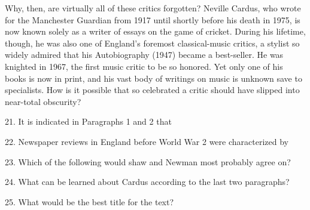 \qquad Why, then, are virtually all of these critics forgotten? Neville Cardus, who wrote for the Manchester Guardian from 1917 until shortly before his death in 1975, is now known solely as a writer of essays on the game of cricket. During his lifetime, though, he was also one of England’s foremost classical-music critics, a stylist so widely admired that his Autobiography (1947) became a best-seller. He was knighted in 1967, the first music critic to be so honored. Yet only one of his books is now in print, and his vast body of writings on music is unknown save to specialists. How is it possible that so celebrated a critic should have slipped into near-total obscurity?

21. It is indicated in Paragraphs 1 and 2 that\par

22. Newspaper reviews in England before World War 2 were characterized by\par

23. Which of the following would shaw and Newman most probably agree on?\par

24. What can be learned about Cardus according to the last two paragraphs?\par

25. What would be the best title for the text?\par
